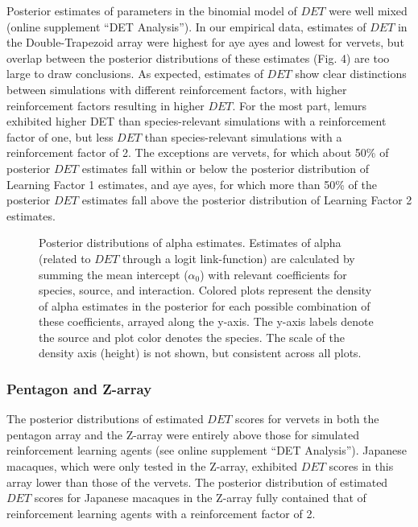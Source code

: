 \documentclass[twoside,12pt,final]{ucthesis-CA2012}
\begin{document}
\begin{ucmainmatter}
Posterior estimates of parameters in the binomial model of \(DET\) were well mixed (online supplement ``DET Analysis''). In our empirical data, estimates of \(DET\) in the Double-Trapezoid array were highest for aye ayes and lowest for vervets, but overlap between the posterior distributions of these estimates (Fig. 4) are too large to draw conclusions. As expected, estimates of \(DET\) show clear distinctions between simulations with different reinforcement factors, with higher reinforcement factors resulting in higher \(DET\). For the most part, lemurs exhibited higher DET than species-relevant simulations with a reinforcement factor of one, but less \(DET\) than species-relevant simulations with a reinforcement factor of 2. The exceptions are vervets, for which about 50\% of posterior \(DET\) estimates fall within or below the posterior distribution of Learning Factor 1 estimates, and aye ayes, for which more than 50\% of the posterior \(DET\) estimates fall above the posterior distribution of Learning Factor 2 estimates.
\begin{figure}[htbp]
\centering
\setlength{\fboxsep}{0pt}
\setlength{\fboxrule}{1pt}
\caption[Posterior distributions of alpha estimates]{ Posterior distributions of alpha estimates. Estimates of alpha (related to $DET$ through a logit link-function) are calculated by summing the mean intercept ($\alpha_0$) with relevant coefficients for species, source, and interaction. Colored plots represent the density of alpha estimates in the posterior for each possible combination of these coefficients, arrayed along the y-axis. The y-axis labels denote the source and plot color denotes the species. The scale of the density axis (height) is not shown, but consistent across all plots.
\label{fig4_DET}}
\end{figure}
\hypertarget{pentagon-and-z-array}{%
\subsubsection{Pentagon and Z-array}\label{pentagon-and-z-array}}

The posterior distributions of estimated \(DET\) scores for vervets in both the pentagon array and the Z-array were entirely above those for simulated reinforcement learning agents (see online supplement ``DET Analysis''). Japanese macaques, which were only tested in the Z-array, exhibited \(DET\) scores in this array lower than those of the vervets. The posterior distribution of estimated \(DET\) scores for Japanese macaques in the Z-array fully contained that of reinforcement learning agents with a reinforcement factor of 2.


\end{ucmainmatter}
\end{document}

